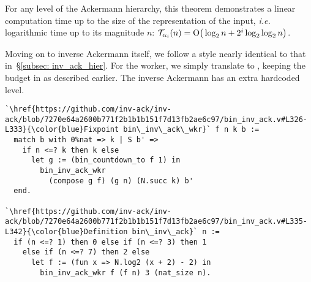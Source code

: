 \noindent For any level of the Ackermann hierarchy, this theorem demonstrates
a linear computation time up to the size of the representation of the input, \emph{i.e.} logarithmic time up to its magnitude $n$:
$\mathcal{T}_{\alpha_i}(n) = \text{O}\big(\log_2n + 2^i\log_2\log_2n \big)$.

Moving on to inverse Ackermann itself, we follow a style nearly identical to that
in~\S\ref{subsec: inv_ack_hier}. For the worker, we simply translate to
, keeping the budget in  as described earlier.
The inverse Ackermann has an extra hardcoded level.
%
\begin{lstlisting}
`\href{https://github.com/inv-ack/inv-ack/blob/7270e64a2600b771f2b1b1b151f7d13fb2ae6c97/bin_inv_ack.v#L326-L333}{\color{blue}Fixpoint bin\_inv\_ack\_wkr}` f n k b :=
  match b with 0%nat => k | S b' =>
    if n <=? k then k else
      let g := (bin_countdown_to f 1) in
        bin_inv_ack_wkr
          (compose g f) (g n) (N.succ k) b'
  end.

`\href{https://github.com/inv-ack/inv-ack/blob/7270e64a2600b771f2b1b1b151f7d13fb2ae6c97/bin_inv_ack.v#L335-L342}{\color{blue}Definition bin\_inv\_ack}` n :=
  if (n <=? 1) then 0 else if (n <=? 3) then 1
    else if (n <=? 7) then 2 else
      let f := (fun x => N.log2 (x + 2) - 2) in
        bin_inv_ack_wkr f (f n) 3 (nat_size n).
\end{lstlisting}

